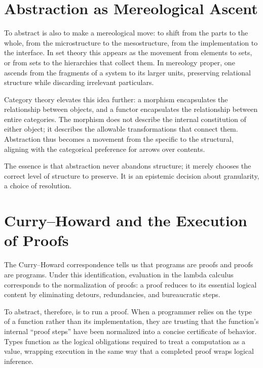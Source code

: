 \documentclass[11pt,letterpaper]{article}
\begin{document}
\section{Abstraction as Mereological Ascent}

To abstract is also to make a mereological move: to shift from the parts to the whole, from the microstructure to the mesostructure, from the implementation to the interface. In set theory this appears as the movement from elements to sets, or from sets to the hierarchies that collect them. In mereology proper, one ascends from the fragments of a system to its larger units, preserving relational structure while discarding irrelevant particulars.

Category theory elevates this idea further: a morphism encapsulates the relationship between objects, and a functor encapsulates the relationship between entire categories. The morphism does not describe the internal constitution of either object; it describes the allowable transformations that connect them. Abstraction thus becomes a movement from the specific to the structural, aligning with the categorical preference for arrows over contents.

The essence is that abstraction never abandons structure; it merely chooses the correct level of structure to preserve. It is an epistemic decision about granularity, a choice of resolution.

\section{Curry--Howard and the Execution of Proofs}

The Curry--Howard correspondence tells us that programs are proofs and proofs are programs. Under this identification, evaluation in the lambda calculus corresponds to the normalization of proofs: a proof reduces to its essential logical content by eliminating detours, redundancies, and bureaucratic steps.

To abstract, therefore, is to run a proof. When a programmer relies on the type of a function rather than its implementation, they are trusting that the function's internal “proof steps” have been normalized into a concise certificate of behavior. Types function as the logical obligations required to treat a computation as a value, wrapping execution in the same way that a completed proof wraps logical inference.
\end{document}
